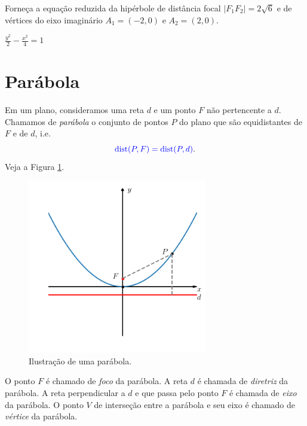 \begin{exer}
  Forneça a equação reduzida da hipérbole de distância focal $|F_1F_2|=2\sqrt{6}$ e de vértices do eixo imaginário $A_1=(-2, 0)$ e $A_2=(2, 0)$.
\end{exer}
\begin{resp}
  $\displaystyle \frac{y^2}{2} - \frac{x^2}{4} = 1$
\end{resp}

\section{Parábola}\label{cap_conicas_sec_parabola}

Em um plano, consideramos uma reta $d$ e um ponto $F$ não pertencente a $d$. Chamamos de \emph{parábola} o conjunto de pontos $P$ do plano que são equidistantes de $F$ e de $d$, i.e.
\begin{equation}
  {\color{blue}\operatorname{dist}(P, F) = \operatorname{dist}(P, d)}.
\end{equation}
Veja a Figura \ref{fig:parabola}.

\begin{figure}[H]
  \centering
  \includegraphics[width=0.7\textwidth]{./cap_conicas/dados/fig_parabola/fig_parabola}
  \caption{Ilustração de uma parábola.}
  \label{fig:parabola}
\end{figure}

O ponto $F$ é chamado de \emph{foco} da parábola. A reta $d$ é chamada de \emph{diretriz} da parábola. A reta perpendicular a $d$ e que passa pelo ponto $F$ é chamada de \emph{eixo} da parábola. O ponto $V$ de interseção entre a parábola e seu eixo é chamado de \emph{vértice} da parábola.

